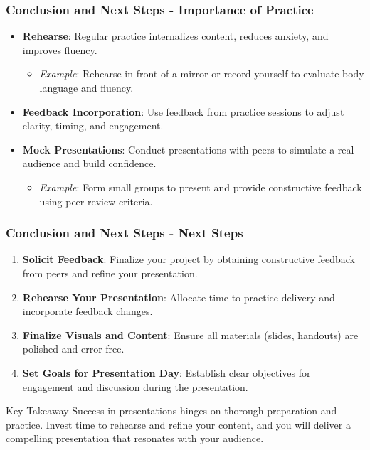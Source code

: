 \documentclass{beamer}
\begin{document}
\begin{frame}[fragile]
    \frametitle{Conclusion and Next Steps - Importance of Practice}
    \begin{itemize}
        \item \textbf{Rehearse}: 
        Regular practice internalizes content, reduces anxiety, and improves fluency.
        \begin{itemize}
            \item \textit{Example}: Rehearse in front of a mirror or record yourself to evaluate body language and fluency.
        \end{itemize}
        
        \item \textbf{Feedback Incorporation}:
        Use feedback from practice sessions to adjust clarity, timing, and engagement.
        
        \item \textbf{Mock Presentations}:
        Conduct presentations with peers to simulate a real audience and build confidence.
        \begin{itemize}
            \item \textit{Example}: Form small groups to present and provide constructive feedback using peer review criteria.
        \end{itemize}
    \end{itemize}
\end{frame}

\begin{frame}[fragile]
    \frametitle{Conclusion and Next Steps - Next Steps}
    \begin{enumerate}
        \item \textbf{Solicit Feedback}:
        Finalize your project by obtaining constructive feedback from peers and refine your presentation.
        
        \item \textbf{Rehearse Your Presentation}:
        Allocate time to practice delivery and incorporate feedback changes.
        
        \item \textbf{Finalize Visuals and Content}:
        Ensure all materials (slides, handouts) are polished and error-free.
        
        \item \textbf{Set Goals for Presentation Day}:
        Establish clear objectives for engagement and discussion during the presentation.
    \end{enumerate}
    
    \begin{block}{Key Takeaway}
        Success in presentations hinges on thorough preparation and practice. Invest time to rehearse and refine your content, and you will deliver a compelling presentation that resonates with your audience.
    \end{block}
\end{frame}
\end{document}
